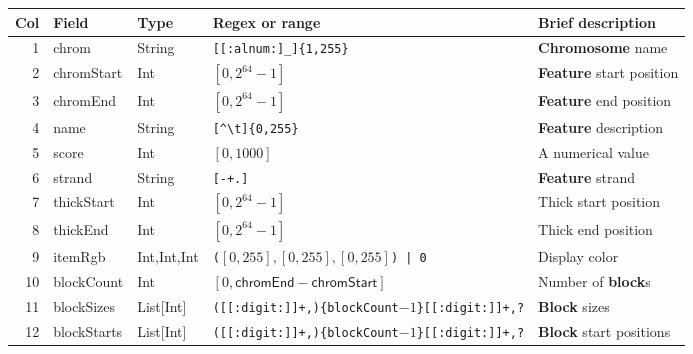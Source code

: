 \documentclass[11pt]{article}
\begin{document}
\begin{adjustwidth}{-0.5in}{-0.5in}
  \noindent
  \begin{tabularx}{\linewidth}{r l l l L}
    \toprule
    Col & Field & Type & Regex or range & Brief description \\
     & \textsf{chrom} & String & \texttt{[[:alnum:]\_]\{1,255\}}{\footnotemark} & \textbf{Chromosome} name \\
    2 & \textsf{chromStart} & Int & $[0, 2^{64}-1]$ & \textbf{Feature} start position \\
    3 & \textsf{chromEnd} & Int & $[0, 2^{64} -1]$ & \textbf{Feature} end position \\
    4 & \textsf{name} & String & \texttt{[{\textasciicircum}{\textbackslash}t]\{0,255\}} & \textbf{Feature} description \\
    5 & \textsf{score} & Int & $[0, 1000]$ & A numerical value \\
    6 & \textsf{strand} & String & \texttt{[-+.]} & \textbf{Feature} strand \\
    7 & \textsf{thickStart} & Int & $[0, 2^{64}-1]$ & Thick start position \\
    8 & \textsf{thickEnd} & Int & $[0, 2^{64}-1]$ & Thick end position \\
    9 & \textsf{itemRgb} & Int,Int,Int & \texttt{(}$[0, 255], [0,255], [0,255]$\texttt{) | 0} & Display color \\ %
    10 & \textsf{blockCount} & Int & $[0, \textsf{chromEnd}-\textsf{chromStart}]${\footnotemark} & Number of \textbf{block}s \\
    11 & \textsf{blockSizes} & List[Int] & \texttt{([[:digit:]]+,)\{\textsf{blockCount}$-1$\}[[:digit:]]+,?}{\footnotemark} & \textbf{Block} sizes \\
    12 & \textsf{blockStarts} & List[Int] & \texttt{([[:digit:]]+,)\{\textsf{blockCount}$-1$\}[[:digit:]]+,?} & \textbf{Block} start positions \\
    \bottomrule
  \end{tabularx}\label{sec:table}
\end{adjustwidth}
\end{document}
